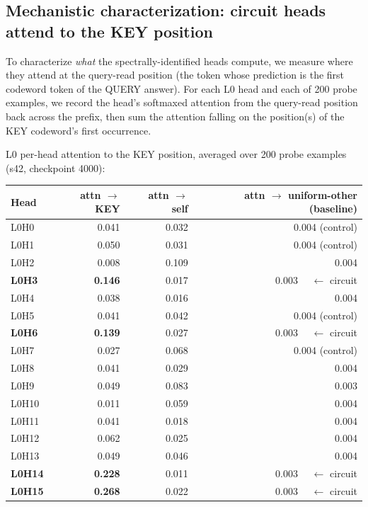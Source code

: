 \documentclass[11pt]{article}
\begin{document}
\subsection{Mechanistic characterization: circuit heads attend to the KEY position}
\label{sec:s42_mechinterp}

To characterize \emph{what} the spectrally-identified heads compute, we measure where they attend at the query-read position (the token whose prediction is the first codeword token of the QUERY answer). For each L0 head and each of 200 probe examples, we record the head's softmaxed attention from the query-read position back across the prefix, then sum the attention falling on the position(s) of the KEY codeword's first occurrence.

L0 per-head attention to the KEY position, averaged over 200 probe examples (s42, checkpoint 4000):

\begin{center}
\small
\begin{tabular}{lrrr}
\toprule
Head & attn $\to$ KEY & attn $\to$ self & attn $\to$ uniform-other (baseline) \\
\midrule
L0H0   & 0.041 & 0.032 & 0.004 (control) \\
L0H1   & 0.050 & 0.031 & 0.004 (control) \\
L0H2   & 0.008 & 0.109 & 0.004 \\
\textbf{L0H3}  & \textbf{0.146} & 0.017 & 0.003 \ \  $\leftarrow$ circuit \\
L0H4   & 0.038 & 0.016 & 0.004 \\
L0H5   & 0.041 & 0.042 & 0.004 (control) \\
\textbf{L0H6}  & \textbf{0.139} & 0.027 & 0.003 \ \  $\leftarrow$ circuit \\
L0H7   & 0.027 & 0.068 & 0.004 (control) \\
L0H8   & 0.041 & 0.029 & 0.004 \\
L0H9   & 0.049 & 0.083 & 0.003 \\
L0H10  & 0.011 & 0.059 & 0.004 \\
L0H11  & 0.041 & 0.018 & 0.004 \\
L0H12  & 0.062 & 0.025 & 0.004 \\
L0H13  & 0.049 & 0.046 & 0.004 \\
\textbf{L0H14} & \textbf{0.228} & 0.011 & 0.003 \ \  $\leftarrow$ circuit \\
\textbf{L0H15} & \textbf{0.268} & 0.022 & 0.003 \ \  $\leftarrow$ circuit \\
\bottomrule
\end{tabular}
\end{center}
\end{document}
